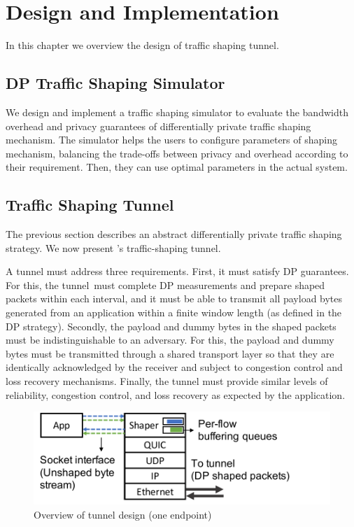 \chapter{Design and Implementation}\label{ch:design-implementation}
In this chapter we overview the design of {\sys} traffic shaping tunnel. 


\section{DP Traffic Shaping Simulator}\label{s}
We design and implement a traffic shaping simulator to evaluate the bandwidth overhead and privacy guarantees of {\sys} differentially private traffic shaping mechanism.
The simulator helps the users to configure parameters of {\sys} shaping mechanism, balancing the trade-offs between privacy and overhead according to their requirement.
Then, they can use optimal parameters in the actual {\sys} system.



\section{Traffic Shaping Tunnel}\label{sec:tunnel-overview}

The previous section describes an abstract differentially private traffic shaping strategy.
We now present \sys's traffic-shaping tunnel.

A tunnel must address three requirements. First, it must satisfy DP guarantees. For this, the tunnel~must complete DP measurements and prepare shaped packets within each interval, and it must be able to transmit all payload bytes generated from an application within a finite window length (as defined in the DP strategy).
%
Secondly, the payload and dummy bytes in the shaped packets must be indistinguishable to an adversary.
For this, the payload and dummy bytes must be transmitted through a shared transport layer so that they are identically acknowledged by the receiver and subject to congestion control and loss recovery mechanisms.
%
Finally, the tunnel must provide similar levels of reliability, congestion control, and loss recovery as expected by the application.
\begin{figure}[t]
  \centering
  \includegraphics[width=\columnwidth]{figures/design2.pdf}
  \caption{Overview of tunnel design (one endpoint)
  }
  \label{fig:minesvpn-overview}
\end{figure}

